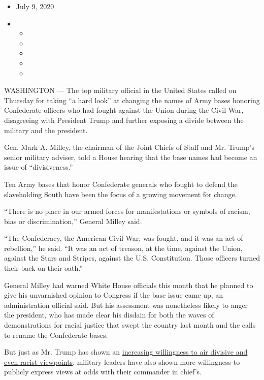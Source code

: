 \begin{itemize}
\item
  July 9, 2020
\item
  \begin{itemize}
  \item
  \item
  \item
  \item
  \item
  \end{itemize}
\end{itemize}

WASHINGTON --- The top military official in the United States called on
Thursday for taking ``a hard look'' at changing the names of Army bases
honoring Confederate officers who had fought against the Union during
the Civil War, disagreeing with President Trump and further exposing a
divide between the military and the president.

Gen. Mark A. Milley, the chairman of the Joint Chiefs of Staff and Mr.
Trump's senior military adviser, told a House hearing that the base
names had become an issue of ``divisiveness.''

Ten Army bases that honor Confederate generals who fought to defend the
slaveholding South have been the focus of a growing movement for change.

``There is no place in our armed forces for manifestations or symbols of
racism, bias or discrimination,'' General Milley said.

``The Confederacy, the American Civil War, was fought, and it was an act
of rebellion,'' he said. ``It was an act of treason, at the time,
against the Union, against the Stars and Stripes, against the U.S.
Constitution. Those officers turned their back on their oath.''

General Milley had warned White House officials this month that he
planned to give his unvarnished opinion to Congress if the base issue
came up, an administration official said. But his assessment was
nonetheless likely to anger the president, who has made clear his
disdain for both the waves of demonstrations for racial justice that
swept the country last month and the calls to rename the Confederate
bases.

But just as Mr. Trump has shown an
\href{https://www.nytimes.com/2020/06/23/us/politics/trump-race-racism-protests.htmlhttps://www.nytimes.com/2020/06/23/us/politics/trump-race-racism-protests.html}{increasing
willingness to air divisive and even racist viewpoints}, military
leaders have also shown more willingness to publicly express views at
odds with their commander in chief's.

